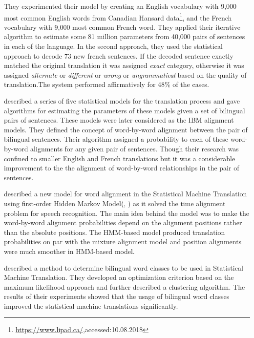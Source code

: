 They experimented their model by creating an English vocabulary with 9,000 most common English words from Canadian Hansard data\footnote{\url{https://www.lipad.ca/},accessed:10.08.2018}, and the French vocabulary with 9,000 most common French word. They applied their iterative algorithm to estimate some 81 million parameters from 40,000 pairs of sentences in each of the language. In the second approach, they used the statistical approach to decode 73 new french sentences. If the decoded sentence exactly matched the original translation it was assigned \textit{exact} category, otherwise it was assigned \textit{alternate} or \textit{different} or \textit{wrong} or \textit{ungrammatical} based on the quality of translation.The system performed affirmatively for 48\% of the cases.

\cite{Brown:1993:MSM:972470.972474} described a series of five statistical models for the translation process and gave algorithms for estimating the parameters of these models given a set of bilingual pairs of sentences. These models were later considered as the IBM alignment models. They defined the concept of word-by-word alignment between the pair of bilingual sentences. Their algorithm assigned a probability to each of these word-by-word alignments for any given pair of sentences. Though their research was confined to smaller English and French translations but it was a considerable improvement to the the alignment of word-by-word relationships in the pair of sentences.

\cite{Vogel:1996:HWA:993268.993313} described a new model for word alignment in the Statistical Machine Translation using first-order Hidden Markov Model(\citeauthor{Jelinek76continuousspeech}, \citeyear{Jelinek76continuousspeech}) as it solved the time alignment problem for speech recognition. The main idea behind the model was to make the word-by-word alignment probabilities depend on the alignment positions rather than the absolute positions. The HMM-based model produced translation probabilities on par with the mixture alignment model and position alignments were much smoother in HMM-based model.

\cite{Och:1999:EMD:977035.977046} described a method to determine bilingual word classes to be used in Statistical Machine Translation. They developed an optimization criterion based on the maximum likelihood approach and further described a clustering algorithm. The results of their experiments showed that the usage of bilingual word classes improved the statistical machine translations significantly.

